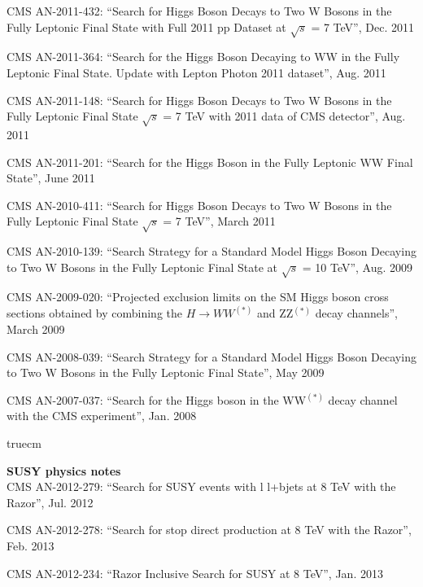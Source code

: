 CMS AN-2011-432: ``Search for Higgs Boson Decays to Two W Bosons in the Fully Leptonic Final State with Full 2011 pp Dataset at $\sqrt{s}$ = 7 TeV'', Dec. 2011

CMS AN-2011-364: ``Search for the Higgs Boson Decaying to WW in the Fully Leptonic Final State. Update with Lepton Photon 2011 dataset'', Aug. 2011

CMS AN-2011-148: ``Search for Higgs Boson Decays to Two W Bosons in the Fully Leptonic Final State $\sqrt{s}$ = 7 TeV with 2011 data of CMS detector'', Aug. 2011

CMS AN-2011-201: ``Search for the Higgs Boson in the Fully Leptonic WW Final State'', June 2011

CMS AN-2010-411: ``Search for Higgs Boson Decays to Two W Bosons in the Fully Leptonic Final State $\sqrt{s}$ = 7 TeV'', March 2011

CMS AN-2010-139: ``Search Strategy for a Standard Model Higgs Boson Decaying to Two W Bosons in the Fully Leptonic Final State at $\sqrt{s}$ = 10 TeV'', Aug. 2009

CMS AN-2009-020: ``Projected exclusion limits on the SM Higgs boson cross sections obtained by combining the $H \to WW^(*)$ and ZZ$^(*)$ decay channels'', March 2009

CMS AN-2008-039: ``Search Strategy for a Standard Model Higgs Boson Decaying to Two W Bosons in the Fully Leptonic Final State'', May 2009

CMS AN-2007-037: ``Search for the Higgs boson in the WW$^(*)$ decay channel with the CMS experiment'', Jan. 2008



 truecm

        {\bf SUSY physics notes}
        \\    

CMS AN-2012-279: ``Search for SUSY events with l l+bjets at 8 TeV with the Razor'', Jul. 2012

CMS AN-2012-278: ``Search for stop direct production at 8 TeV with the Razor'', Feb. 2013

CMS AN-2012-234: ``Razor Inclusive Search for SUSY at 8 TeV'', Jan. 2013


